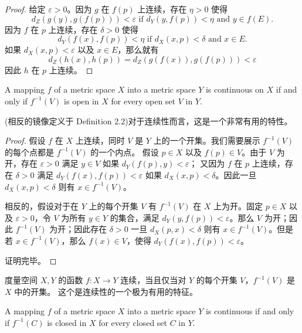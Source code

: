 \documentclass[../poma-notes.tex]{subfiles}
\begin{document}
\begin{proof}
  给定 $\varepsilon > 0$。因为 $g$ 在 $f(p)$ 上连续，存在 $\eta > 0$ 使得
  \[
    d_Z(g(y),g(f(p))) < \varepsilon \text{ if } d_Y(y,f(p)) < \eta \text{ and } y \in f(E).
  \]
  因为 $f$ 在 $p$ 上连续，存在 $\delta > 0$ 使得
  \[
    d_Y(f(x),f(p)) < \eta \text{ if } d_X(x,p) < \delta \text{ and } x \in E.
  \]
  如果 $d_X(x,p) < \varepsilon$ 以及 $x \in E$，那么就有
  \[
    d_Z(h(x),h(p)) = d_Z(g(f(x)), g(f(p))) < \varepsilon
  \]
  因此 $h$ 在 $p$ 上连续。
\end{proof}

\begin{theorem}
  A mapping $f$ of a metric space $X$ into a metric space $Y$ is continuous on $X$ if and only if $f^{-1}(V)$
  is open in $X$ for every open set $V$ in $Y$.
\end{theorem}

(相反的镜像定义于 Definition 2.2)对于连续性而言，这是一个非常有用的特性。

\begin{proof}
  假设 $f$ 在 $X$ 上连续，同时 $V$ 是 $Y$ 上的一个开集。我们需要展示 $f^{-1}(V)$ 的每个点都是 $f^{-1}(V)$ 的一个内点。
  假设 $p \in X$ 以及 $f(p) \in V$。由于 $V$ 为开，存在 $\varepsilon > 0$ 满足 $y \in V$ 如果 $d_Y(f(p),y)<\varepsilon$；
  又因为 $f$ 在 $p$ 上连续，存在 $\delta > 0$ 满足 $d_Y(f(x),f(p))<\varepsilon$ 如果 $d_X(x,p)<\delta$。因此一旦
  $d_X(x,p)<\delta$ 则有 $x \in f^{-1}(V)$。

  相反的，假设对于在 $Y$ 上的每个开集 $V$ 有 $f^{-1}(V)$ 在 $X$ 上为开。固定 $p \in X$ 以及 $\varepsilon > 0$，令 $V$
  为所有 $y \in Y$ 的集合，满足 $d_Y(y,f(p))<\varepsilon$。那么 $V$ 为开；因此 $f^{-1}(V)$ 为开；因此存在 $\delta > 0$
  一旦 $d_X(p,x) < \delta$ 则有 $x \in f^{-1}(V)$。但是若 $x \in f^{-1}(V)$，那么 $f(x) \in V$，使得
  $d_Y(f(x),f(p))<\varepsilon$。

  证明完毕。
\end{proof}

\begin{anote}
  度量空间 $X, Y$ 的函数 $f: X \to Y$ 连续，当且仅当对 $Y$ 的每个开集 $V$，$f^{-1}(V)$ 是 $X$ 中的开集。
  这个是连续性的一个极为有用的特征。
\end{anote}

\begin{corollary}
  A mapping $f$ of a metric space $X$ into a metric space $Y$ is continuous if and only if $f^{-1}(C)$ is closed
  in $X$ for every closed set $C$ in $Y$.
\end{corollary}
\end{document}
